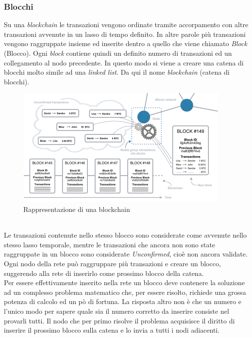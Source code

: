 \documentclass[11pt]{thesistemp}
\begin{document}
\subsubsection{Blocchi}
Su una \textit{blockchain} le transazioni vengono ordinate tramite accorpamento con altre transazioni avvenute in un lasso di tempo definito.
In altre parole più transazioni vengono raggruppate insieme ed inserite dentro a quello che viene chiamato \textit{Block} (Blocco). 
Ogni \textit{block} contiene quindi un definito numero di transazioni ed un collegamento al nodo precedente. 
In questo modo si viene a creare una catena di blocchi molto simile ad una \textit{linked list}.
Da qui il nome \textit{blockchain} (catena di blocchi).
\begin{figure}[h]\hfill
    \centering
    \includegraphics[width=\textwidth]{blocks.png}
    \caption{Rappresentazione di una blockchain}
    \label{fig:blocks}
\end{figure}\\
Le transazioni contenute nello stesso blocco sono considerate come avvenute nello stesso lasso temporale, mentre le transazioni che ancora non sono state raggruppate in un blocco sono considerate \textit{Unconfirmed}, cioè non ancora validate.\\ 
Ogni nodo della rete può raggruppare più transazioni e creare un blocco, suggerendo alla rete di inserirlo come prossimo blocco della catena. \\
Per essere effettivamente inserito nella rete un blocco deve contenere la soluzione ad un complesso problema matematico che, per essere risolto, richiede una grossa potenza di calcolo ed un pò di fortuna.
La risposta altro non è che un numero e l'unico modo per sapere quale sia il numero corretto da inserire consiste nel provarli tutti.
Il nodo che per primo risolve il problema acquisisce il diritto di inserire il prossimo blocco sulla catena e lo invia a tutti i nodi adiacenti.
\end{document}
